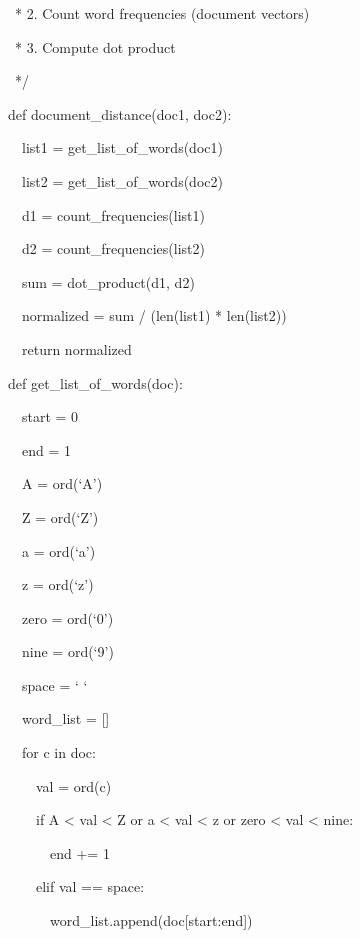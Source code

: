\documentclass[letterpaper]{article}
\begin{document}
{\ttfamily
\ * 2. Count word frequencies (document vectors)}

{\ttfamily
\ * 3. Compute dot product}

{\ttfamily
\ */ }


\bigskip

{\ttfamily
def document\_distance(doc1, doc2):}

{\ttfamily
\ \ list1 = get\_list\_of\_words(doc1)}

{\ttfamily
\ \ list2 = get\_list\_of\_words(doc2)}


\bigskip

{\ttfamily
\ \ d1 = count\_frequencies(list1)}

{\ttfamily
\ \ d2 = count\_frequencies(list2)}


\bigskip

{\ttfamily
\ \ sum = \textrm{dot\_product(d1, d2)}}


\bigskip

{\ttfamily
\textrm{\ \ normalized = sum / (len(list1) * len(list2))}}


\bigskip

{\ttfamily
\textrm{\ \ return normalized }}


\bigskip

{\ttfamily
def get\_list\_of\_words(doc):}

{\ttfamily
\ \ start = 0}

{\ttfamily
\ \ end = 1}

{\ttfamily
\ \ A = ord(`A')}

{\ttfamily
\ \ Z = ord(`Z')}

{\ttfamily
\ \ a = ord(`a')}

{\ttfamily
\ \ z = ord(`z')}

{\ttfamily
\ \ zero = ord(`0')}

{\ttfamily
\ \ nine = ord(`9')}

{\ttfamily
\ \ space = ` `}

{\ttfamily
\ \ word\_list = []}


\bigskip

{\ttfamily
\ \ for c in doc:}

{\ttfamily
\ \ \ \ val = ord(c)}

{\ttfamily
\ \ \ \ if A {\textless} val {\textless} Z or a {\textless} val {\textless} z or zero {\textless} val {\textless} nine:}

{\ttfamily
\ \ \ \ \ \ end += 1}

{\ttfamily
\ \ \ \ elif val == space:}

{\ttfamily
\ \ \ \ \ \ word\_list.append(doc[start:end])}
\end{document}
